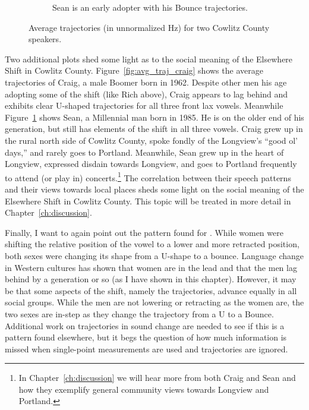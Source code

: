 \begin{figure}[tb!]
\begin{subfigure}[t]{2.925in}
        \caption{Sean is an early adopter with his Bounce trajectories.}
        \label{fig:avg_traj_sean}
    \end{subfigure}
    \hspace{\fill}
    \caption{Average trajectories (in unnormalized Hz) for two Cowlitz County speakers.}
    \label{fig:craig_and_sean}
\end{figure}

Two additional plots shed some light as to the social meaning of the Elsewhere Shift in Cowlitz County. Figure~\ref{fig:avg_traj_craig} shows the average trajectories of Craig, a male Boomer born in 1962. Despite other men his age adopting some of the shift (like Rich above), Craig appears to lag behind and exhibits clear U-shaped trajectories for all three front lax vowels. Meanwhile Figure~\ref{fig:avg_traj_sean} shows Sean, a Millennial man born in 1985. He is on the older end of his generation, but still has elements of the shift in all three vowels. Craig grew up in the rural north side of Cowlitz County, spoke fondly of the Longview's ``good ol' days,'' and rarely goes to Portland. Meanwhile, Sean grew up in the heart of Longview, expressed disdain towards Longview, and goes to Portland frequently to attend (or play in) concerts.\footnote{In Chapter~\ref{ch:discussion} we will hear more from both Craig and Sean and how they exemplify general community views towards Longview and Portland.} The correlation between their speech patterns and their views towards local places sheds some light on the social meaning of the Elsewhere Shift in Cowlitz County. This topic will be treated in more detail in Chapter~\ref{ch:discussion}.

Finally, I want to again point out the pattern found for \bet. While women were shifting the relative position of the vowel to a lower and more retracted position, both sexes were changing its shape from a U-shape to a bounce. Language change in Western cultures has shown that women are in the lead and that the men lag behind by a generation or so (as I have shown in this chapter). However, it may be that some aspects of the shift, namely the trajectories, advance equally in all social groups. While the men are not lowering or retracting \bet as the women are, the two sexes are in-step as they change the trajectory from a U to a Bounce. Additional work on trajectories in sound change are needed to see if this is a pattern found elsewhere, but it begs the question of how much information is missed when single-point measurements are used and trajectories are ignored.



